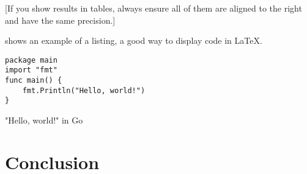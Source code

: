 [If you show results in tables, always ensure all of them are aligned to the right and have the same precision.]

 shows an example of a listing, a good way to display code in \LaTeX.

\begin{listing}[th]
	\begin{verbatim}
package main
import "fmt"
func main() {
	fmt.Println("Hello, world!")
}
	\end{verbatim}
\caption{"Hello, world!" in Go}
\label{lst:hello}
\end{listing}

\section{Conclusion}
\lipsum[2]
